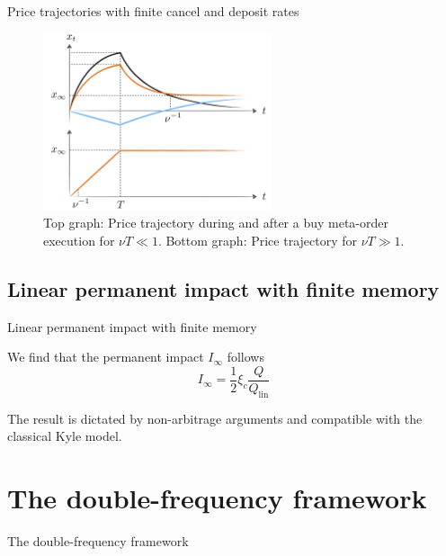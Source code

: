 \documentclass{beamer}
\begin{document}
\begin{frame}{Price trajectories with finite cancel and deposit rates}

\begin{figure}
\centering
\includegraphics[width=0.6\textwidth]{figure2.PNG}
\caption{\label{fig:f2}Top graph: Price trajectory during and after a buy meta-order execution for $\nu T \ll 1$. Bottom graph: Price trajectory for $\nu T \gg 1$.}
\end{figure}

\end{frame}

\subsection{Linear permanent impact with finite memory}

\begin{frame}{Linear permanent impact with finite memory}

We find that the permanent impact $I_\infty$ follows
\begin{equation}
I_\infty=\frac12\xi_c\frac{Q}{Q_\text{lin}}
\end{equation}

The result is dictated by non-arbitrage arguments and compatible with the classical Kyle model.

\end{frame}

\section{The double-frequency framework}

\begin{frame}{The double-frequency framework}
  \tableofcontents[currentsection]
\end{frame}
\end{document}
